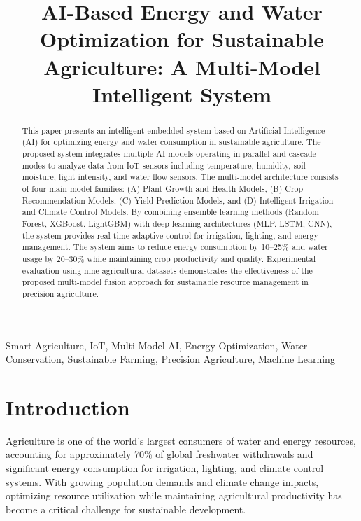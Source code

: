 \documentclass[conference]{IEEEtran}
\begin{document}
\title{AI-Based Energy and Water Optimization for Sustainable Agriculture: A Multi-Model Intelligent System}

\author{
}

\maketitle

\begin{abstract}
This paper presents an intelligent embedded system based on Artificial Intelligence (AI) for optimizing energy and water consumption in sustainable agriculture. The proposed system integrates multiple AI models operating in parallel and cascade modes to analyze data from IoT sensors including temperature, humidity, soil moisture, light intensity, and water flow sensors. The multi-model architecture consists of four main model families: (A) Plant Growth and Health Models, (B) Crop Recommendation Models, (C) Yield Prediction Models, and (D) Intelligent Irrigation and Climate Control Models. By combining ensemble learning methods (Random Forest, XGBoost, LightGBM) with deep learning architectures (MLP, LSTM, CNN), the system provides real-time adaptive control for irrigation, lighting, and energy management. The system aims to reduce energy consumption by 10--25\% and water usage by 20--30\% while maintaining crop productivity and quality. Experimental evaluation using nine agricultural datasets demonstrates the effectiveness of the proposed multi-model fusion approach for sustainable resource management in precision agriculture.
\end{abstract}

\begin{IEEEkeywords}
Smart Agriculture, IoT, Multi-Model AI, Energy Optimization, Water Conservation, Sustainable Farming, Precision Agriculture, Machine Learning
\end{IEEEkeywords}

\section{Introduction}

Agriculture is one of the world's largest consumers of water and energy resources, accounting for approximately 70\% of global freshwater withdrawals and significant energy consumption for irrigation, lighting, and climate control systems. With growing population demands and climate change impacts, optimizing resource utilization while maintaining agricultural productivity has become a critical challenge for sustainable development.
\end{document}
